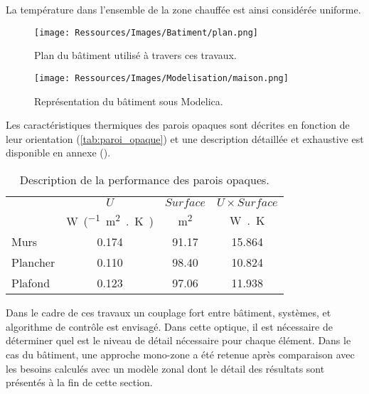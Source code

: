 La température dans l’ensemble de la zone chauffée est ainsi considérée uniforme.
\begin{figure}
    \begin{center}
        \texttt{[image: Ressources/Images/Batiment/plan.png]}
    \end{center}
    \caption{Plan du bâtiment utilisé à travers ces travaux.
             \label{fig:plan_maison}}
\end{figure}

\begin{figure}
    \begin{center}
        \texttt{[image: Ressources/Images/Modelisation/maison.png]}
    \end{center}
    \caption{Représentation du bâtiment sous Modelica.
             \label{fig:modelisation_maison}}
\end{figure}

Les caractéristiques thermiques des parois opaques sont décrites en fonction de
leur orientation (\autoref{tab:paroi_opaque}) et une description détaillée et exhaustive est
disponible en annexe ().
\begin{table}
\centering
\begin{tabular}{l*{3}{c}}
    \toprule
               & $U$                                       & $Surface$             & $U \times Surface$     \\
               & \si{\watt\per(\meter\squared{.}\kelvin)} & \si{\meter\squared}    & \si{\watt{.}\kelvin}  \\
    \midrule
    Murs       & 0.174                                     & 91.17                 & 15.864                 \\
    Plancher   & 0.110                                     & 98.40                 & 10.824                 \\
    Plafond    & 0.123                                     & 97.06                 & 11.938                 \\
    \bottomrule
\end{tabular}
\caption{Description de la performance des parois opaques.}
         \label{tab:paroi_opaque}
\end{table}


Dans le cadre de ces travaux un couplage fort entre bâtiment, systèmes, et algorithme
de contrôle est envisagé. Dans cette optique, il est nécessaire de déterminer quel
est le niveau de détail nécessaire pour chaque élément. Dans le cas du bâtiment, une
approche mono-zone a été retenue après comparaison avec les besoins calculés
avec un modèle zonal dont le détail des résultats sont présentés à la fin de cette section.



